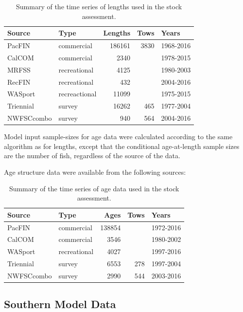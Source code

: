 \documentclass[12pt,]{article}
\begin{document}
\begin{table}[ht]
\centering
\caption{Summary of the time series of lengths used in the stock assessment.} 
\label{tab:Length_sources}
\begin{tabular}{llrrl}
  \hline
Source & Type & Lengths & Tows & Years \\ 
  \hline
PacFIN & commercial & 186161 & 3830 & 1968-2016 \\ 
  CalCOM & commercial & 2340 &  & 1978-2015 \\ 
  MRFSS & recreational & 4125 &  & 1980-2003 \\ 
  RecFIN & recreational & 432 &  & 2004-2016 \\ 
  WASport & recreactional & 11099 &  & 1975-2015 \\ 
  Triennial & survey & 16262 & 465 & 1977-2004 \\ 
  NWFSCcombo & survey & 940 & 564 & 2004-2016 \\ 
   \hline
\end{tabular}
\end{table}

Model input sample-sizes for age data were calculated according to the
same algorithm as for lengths, except that the conditional age-at-length
sample sizes are the number of fish, regardless of the source of the
data.

Age structure data were available from the following sources:

\begin{table}[ht]
\centering
\caption{Summary of the
                                              time series of age data used in the stock
                                              assessment.} 
\label{tab:Age_sources}
\begin{tabular}{llrrl}
  \hline
Source & Type & Ages & Tows & Years \\ 
  \hline
PacFIN & commercial & 138854 &  & 1972-2016 \\ 
  CalCOM & commercial & 3546 &  & 1980-2002 \\ 
  WASport & recreational & 4027 &  & 1997-2016 \\ 
  Triennial & survey & 6553 & 278 & 1997-2004 \\ 
  NWFSCcombo & survey & 2990 & 544 & 2003-2016 \\ 
   \hline
\end{tabular}
\end{table}

\subsection{Southern Model Data}\label{southern-model-data}
\end{document}

